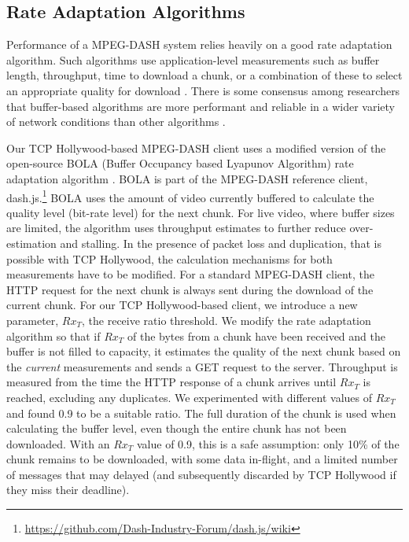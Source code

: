 \subsection{Rate Adaptation Algorithms}

Performance of a MPEG-DASH system relies heavily on a good rate adaptation algorithm.
Such algorithms use application-level measurements such as buffer length, throughput, time to
download a chunk, or a combination of these to select an appropriate quality for
download \cite{beben2016abma+, spiteri2016bola, li2014probe}. There is some consensus
among researchers that buffer-based algorithms are more performant and reliable in a wider
variety of network conditions than other algorithms 
\cite{huang2015buffer, karagkioules2017comparative}.

Our TCP Hollywood-based MPEG-DASH client uses a modified version of the open-source BOLA 
(Buffer Occupancy based Lyapunov Algorithm) rate adaptation algorithm \cite{spiteri2016bola}. 
BOLA is part of the MPEG-DASH reference
client, dash.js.\footnote{\url{https://github.com/Dash-Industry-Forum/dash.js/wiki}}
BOLA uses the amount of video currently buffered to calculate the quality level (bit-rate
level) for the next chunk. For live video, where buffer sizes are limited, the algorithm
uses throughput estimates to further reduce over-estimation and stalling. In the presence
of packet loss and duplication, that is possible with TCP Hollywood, the calculation 
mechanisms for both measurements have to be modified. For a standard MPEG-DASH client,
the HTTP request for the next chunk is always sent 
during the download of the current chunk. For our TCP Hollywood-based client, we
introduce a new parameter, $Rx_{T}$, the receive ratio threshold. We modify
the rate adaptation algorithm so that if $Rx_{T}$ of the
bytes from a chunk have been received and the buffer is not filled to capacity, 
it estimates the quality of the next chunk based on the \emph{current} measurements and
sends a GET request to the server. Throughput is measured from the time the HTTP response
of a chunk arrives until $Rx_{T}$ is reached, excluding any duplicates. We experimented
with different values of $Rx_{T}$ and found 0.9 to be a suitable ratio. The full duration
of the chunk is used when calculating the buffer level, even though the entire chunk has
not been downloaded. With an $Rx_{T}$ value of 0.9, this is a safe assumption: only 10\%
of the chunk remains to be downloaded, with some data in-flight, and a limited number of
messages that may delayed (and subsequently discarded by TCP Hollywood if
they miss their deadline).

